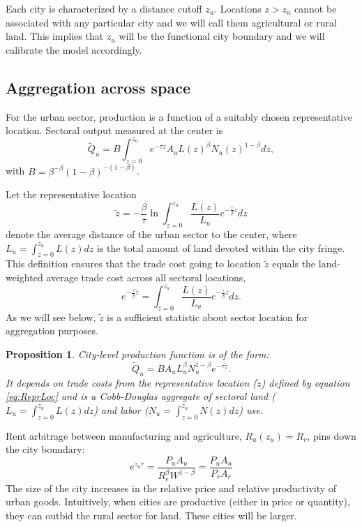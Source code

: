 \documentclass[12pt]{article}
\newtheorem{proposition}{Proposition}
\begin{document}
Each city is characterized by a distance cutoff $z_u$. Locations $z>z_u$ cannot be associated with any particular city and we will call them agricultural or rural land. This implies that $z_u$ will be the functional city boundary and we will calibrate the model accordingly.

\subsection{Aggregation across space}
For the urban sector, production is a function of a suitably chosen representative location. Sectoral output measured at the center is
\begin{equation*}
\tilde{Q}_u=B\int_{z=0}^{z_u}e^{-\tau z}A_uL(z)^\beta N_u(z)^{1-\beta}dz,
\end{equation*}
with $B=\beta^{-\beta}(1-\beta)^{-(1-\beta)}$.

Let the representative location
\begin{equation}
\label{eq:ReprLoc}
\tilde z = -
\frac{\beta}{\tau}
\ln\int_{z=0}^{z_u} \frac{L(z)}{L_u}e^{-\frac{\tau}{\beta} z}dz
\end{equation}
denote the average distance of the urban sector to the center, where $L_u=\int_{z=0}^{z_u} L(z)dz$ is the total amount of land devoted within the city fringe. This definition ensures that the trade cost going to location $\tilde z$ equals the land-weighted average trade cost across all sectoral locations,
\[
e^{-\frac{\tau}{\beta} \tilde z} = \int_{z=0}^{z_u} \frac{L(z)}{L_u}e^{-\frac{\tau}{\beta} z}dz.
\]
As we will see below, $\tilde z$ is a sufficient statistic about sector location for aggregation purposes.

\begin{proposition}\label{prop:aggregation}
City-level production function is of the form:
\begin{equation}
\tilde Q_u =
BA_uL_u^{\beta}N_u^{1-\beta}
 e^{-\tau\tilde z}.
\end{equation}
It depends on trade costs from the representative location ($\tilde{z}$) defined by equation \eqref{eq:ReprLoc} and is a Cobb-Douglas aggregate of sectoral land ($L_u=\int_{z=0}^{z_u}L(z)dz$) and labor ($N_u=\int_{z=0}^{z_u}N(z)dz$) use.
\end{proposition}

Rent arbitrage between manufacturing and agriculture, $R_u(z_{u}) = R_{r}$, pins down the city boundary:
\begin{equation}\label{eq:city_boundary}
e^{z_{u} \tau} =
\frac {P_uA_u} {R_r^{\beta} W^{1-\beta}}
 =
\frac {P_uA_u}{P_rA_r}
\end{equation}
The size of the city increases in the relative price and relative productivity of urban goods. Intuitively, when cities are productive (either in price or quantity), they can outbid the rural sector for land. These cities will be larger. 
\end{document}
